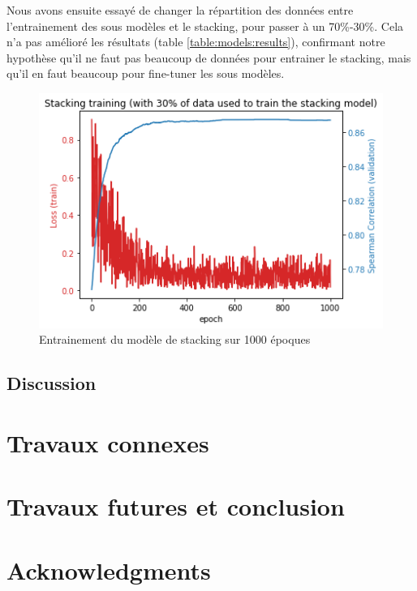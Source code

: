 \documentclass[11pt,a4paper, french]{article}
\begin{document}
Nous avons ensuite essayé de changer la répartition des données entre l'entrainement des sous modèles et le stacking, pour passer à un 70\%-30\%. Cela n'a pas amélioré les résultats (table \ref{table:models:results}), confirmant notre hypothèse qu'il ne faut pas beaucoup de données pour entrainer le stacking, mais qu'il en faut beaucoup pour fine-tuner les sous modèles.

\begin{figure}
  \includegraphics[width=\linewidth]{resources/stack-30-training.png}
  \caption{Entrainement du modèle de stacking sur 1000 époques}
  \label{fig:stack:train}
\end{figure}

\subsection{Discussion}


\section{Travaux connexes}



\section{Travaux futures et conclusion }

\section*{Acknowledgments}
 




\appendix
\end{document}
